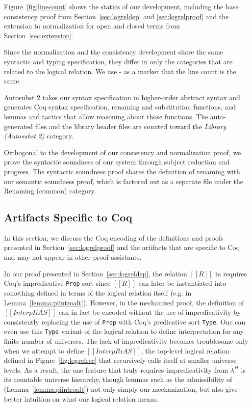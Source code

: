 \documentclass[acmsmall,screen=true,
\ifpublic review=false\else,review=true\fi
  ,anonymous=\ifanonymous true\else false\fi]{acmart}
\newcommand{\lang}{$\lambda^H$\xspace}
\newcommand{\scw}[1]{}
\begin{document}
Figure~\ref{fig:linecount} shows the statics of our
development, including the base consistency proof from
Section~\ref{sec:logreldep} and \ref{sec:logrelproof} and the
extension to normalization for open and closed terms from
Section~\ref{sec:extension}.

Since the normalization and the consistency development share the same
syntactic and typing specification, they differ in only the categories
that are related to the logical relation. We use - as a marker that
the line count is the same.

Autosubst 2 takes our syntax specification in higher-order abstract
syntax and generates Coq syntax specification, renaming and
substitution functions, and lemmas and tactics that allow reasoning
about those functions. The auto-generated files and the library header
files are counted toward the \emph{Library (Autosubst 2)} category.

Orthogonal to the development of our consistency and normalization
proof, we prove the syntactic soundness of our system through subject
reduction and progress. The syntactic soundness proof shares the
definition of renaming with our semantic soundness proof, which is
factored out as a separate file under the Renaming (common) category.

\subsection{Artifacts Specific to Coq}
In this section, we discuss the Coq encoding of the definitions and proofs presented
in Section~\ref{sec:logrelproof}  and the artifacts that are
specific to Coq and may not appear in other proof assistants.


In our proof presented in Section~\ref{sec:logreldep}, the relation
$[[R]]$ in  requires Coq's impredicative \texttt{Prop} sort
since $[[R]]$ can later be instantiated into something defined in
terms of the logical relation itself (e.g. in
Lemma~\ref{lemma:piintroalt}). However, in the mechanized proof, the
definition of $[[Interp I i A S]]$ can in fact be encoded without the
use of impredicativity by consistently replacing the use of
\texttt{Prop} with Coq's predicative sort \texttt{Type}. One can even
use this \texttt{Type} variant of the logical relation to define
interpretation for any finite number of universes. The lack of
impredicativity becomes troublesome only when we attempt to define
$[[InterpR i A S]]$, the top-level logical relation defined in
Figure~\ref{fig:logrelrec} that recursively calls itself at smaller
universe levels. As a result, the one feature that truly requires
impredicativity from \lang{} is its countable universe
hierarchy, though lemmas such as the admissibility of 
(Lemma~\ref{lemma:piintroalt}) not only simply our mechanization, but
also give better intuition on what our logical relation means.
\end{document}
